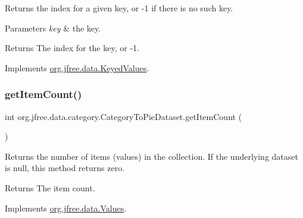 Returns the index for a given key, or {\ttfamily -\/1} if there is no such key.


\begin{DoxyParams}{Parameters}
{\em key} & the key.\\
\hline
\end{DoxyParams}
\begin{DoxyReturn}{Returns}
The index for the key, or {\ttfamily -\/1}. 
\end{DoxyReturn}


Implements \mbox{\hyperlink{interfaceorg_1_1jfree_1_1data_1_1_keyed_values_ae360fa76e98655c84180651f8e1395d7}{org.\+jfree.\+data.\+Keyed\+Values}}.

\mbox{\label{classorg_1_1jfree_1_1data_1_1category_1_1_category_to_pie_dataset_a7536f863e26d692f65131df0ed9150c3}} 
\subsubsection{\texorpdfstring{get\+Item\+Count()}{getItemCount()}}
{\footnotesize\ttfamily int org.\+jfree.\+data.\+category.\+Category\+To\+Pie\+Dataset.\+get\+Item\+Count (\begin{DoxyParamCaption}{ }\end{DoxyParamCaption})}

Returns the number of items (values) in the collection. If the underlying dataset is {\ttfamily null}, this method returns zero.

\begin{DoxyReturn}{Returns}
The item count. 
\end{DoxyReturn}


Implements \mbox{\hyperlink{interfaceorg_1_1jfree_1_1data_1_1_values_afd00781dbc2e351b7a77aca9a91ca0a9}{org.\+jfree.\+data.\+Values}}.

\mbox{\label{classorg_1_1jfree_1_1data_1_1category_1_1_category_to_pie_dataset_a5e57f6d91a01781de16ac109e3933d1d}} 
